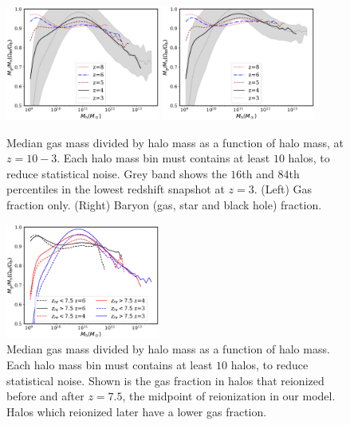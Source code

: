 \documentclass[fleqn,usenatbib]{mnras}
\begin{document}
\begin{figure}
\centering
  \includegraphics[width=0.45\textwidth]{plots/gmhms.pdf}    
  \includegraphics[width=0.45\textwidth]{plots/gmhms-all.pdf}
  \caption{Median gas mass divided by halo mass as a function of halo mass, at $z=10-3$. Each halo mass bin must contains at least $10$ halos, to reduce statistical noise. Grey band shows the $16$th and $84$th percentiles in the lowest redshift snapshot at $z=3$. (Left) Gas fraction only. (Right) Baryon (gas, star and black hole) fraction. }  
  \label{fig:gmhm}
\end{figure}

\begin{figure}
\centering
  \includegraphics[width=0.45\textwidth]{plots/gmhms_reion.pdf}    
  \caption{Median gas mass divided by halo mass as a function of halo mass. Each halo mass bin must contains at least $10$ halos, to reduce statistical noise. Shown is the gas fraction in halos that reionized before and after $z=7.5$, the midpoint of reionization in our model. Halos which reionized later have a lower gas fraction.}  
  \label{fig:gmhm_reion}
\end{figure}
\end{document}
